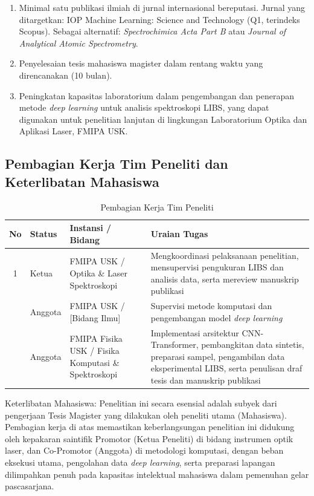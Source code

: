 \documentclass[12pt, a4paper]{article}
\begin{document}
\begin{enumerate}[leftmargin=2cm]
    \item Minimal satu publikasi ilmiah di jurnal internasional bereputasi. Jurnal yang ditargetkan: IOP Machine Learning: Science and Technology (Q1, terindeks Scopus). Sebagai alternatif: \textit{Spectrochimica Acta Part B} atau \textit{Journal of Analytical Atomic Spectrometry}.
    \item Penyelesaian tesis mahasiswa magister dalam rentang waktu yang direncanakan (10 bulan).
    \item Peningkatan kapasitas laboratorium dalam pengembangan dan penerapan metode \textit{deep learning} untuk analisis spektroskopi LIBS, yang dapat digunakan untuk penelitian lanjutan di lingkungan Laboratorium Optika dan Aplikasi Laser, FMIPA USK.
\end{enumerate}


\subsection{Pembagian Kerja Tim Peneliti dan Keterlibatan Mahasiswa}

\begin{table}[htbp]
\centering
\caption{Pembagian Kerja Tim Peneliti}
\label{tab:tim}
\small
\begin{tabular}{|c|l|p{3.5cm}|p{6cm}|}
\hline
No & Status & Instansi / Bidang & Uraian Tugas \\
\hline
1 & Ketua  & FMIPA USK / Optika \& Laser Spektroskopi & Mengkoordinasi pelaksanaan penelitian, mensupervisi pengukuran LIBS dan analisis data, serta mereview manuskrip publikasi \\
\hline
\addlinespace
2 & Anggota & FMIPA USK / [Bidang Ilmu] & Supervisi metode komputasi dan pengembangan model \textit{deep learning} \\
\hline
\addlinespace
3 & Anggota & FMIPA Fisika USK / Fisika Komputasi \& Spektroskopi & Implementasi arsitektur CNN-Transformer, pembangkitan data sintetis, preparasi sampel, pengambilan data eksperimental LIBS, serta penulisan draf tesis dan manuskrip publikasi \\
\hline
\end{tabular}
\end{table}

Keterlibatan Mahasiswa: Penelitian ini secara esensial adalah subyek dari pengerjaan Tesis Magister yang dilakukan oleh peneliti utama (Mahasiswa). Pembagian kerja di atas memastikan keberlangsungan penelitian ini didukung oleh kepakaran saintifik Promotor (Ketua Peneliti) di bidang instrumen optik laser, dan Co-Promotor (Anggota) di metodologi komputasi, dengan beban eksekusi utama, pengolahan data \textit{deep learning}, serta preparasi lapangan dilimpahkan penuh pada kapasitas intelektual mahasiswa dalam pemenuhan gelar pascasarjana.
\end{document}
